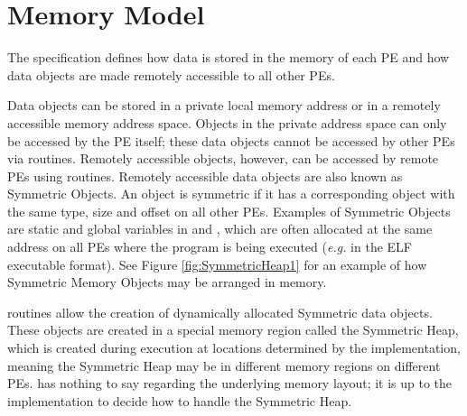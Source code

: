 \section{Memory Model}

The \openshmem specification defines how data is stored in the memory
of each \ac{PE} and how data objects are made remotely accessible to all
other \ac{PE}s.

Data objects can be stored in a private local memory address or in
a remotely accessible memory address space. Objects in the private
address space can only be accessed by the \ac{PE} itself; these data objects
cannot be accessed by other \ac{PE}s via \openshmem routines. Remotely accessible
objects, however, can be accessed by remote \ac{PE}s using \openshmem routines.
Remotely accessible data objects are also known as Symmetric Objects.
An object is symmetric if it has a corresponding object with the same
type, size and offset on all other \ac{PE}s. Examples of Symmetric Objects
are static and global variables in \Clang{} and \Cpp, which are often allocated
at the same address on all \ac{PE}s where the program is being executed
(\emph{e.g.} in the ELF executable format). See Figure \ref{fig:SymmetricHeap1}
for an example of how Symmetric Memory Objects may be arranged in
memory.

\openshmem routines allow the creation of dynamically allocated Symmetric
data objects. These objects are created in a special memory region
called the Symmetric Heap, which is created during execution at locations
determined by the implementation, meaning the Symmetric Heap may be
in different memory regions on different \ac{PE}s. \openshmem has nothing
to say regarding the underlying memory layout; it is up to the implementation
to decide how to handle the Symmetric Heap.

%

